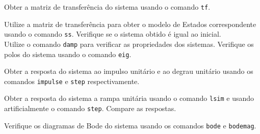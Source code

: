\documentclass{article}
\begin{document}
\newpage\begin{exercise}\label{ex3}
    Obter a matriz de transferência do sistema usando o comando \texttt{tf}.
\end{exercise}
\begin{resolution}

\end{resolution}

\newpage\begin{exercise}\label{ex4}
    Utilize a matriz de transferência para obter o modelo de Estados correspondente usando o comando \texttt{ss}. Verifique se o sistema obtido é igual ao inicial.\\

    Utilize o comando \texttt{damp} para verificar as propriedades dos sistemas. Verifique os polos do sistema usando o comando \texttt{eig}.
\end{exercise}
\begin{resolution}

\end{resolution}

\newpage\begin{exercise}\label{ex5}
    Obter a resposta do sistema ao impulso unitário e ao degrau unitário usando os comandos \texttt{impulse} e \texttt{step} respectivamente.
\end{exercise}
\begin{resolution}

\end{resolution}

\newpage\begin{exercise}\label{ex6}
    Obter a resposta do sistema a rampa unitária usando o comando \texttt{lsim} e usando artificialmente o comando \texttt{step}. Compare as respostas.
\end{exercise}
\begin{resolution}

\end{resolution}

\newpage\begin{exercise}\label{ex7}
    Verifique os diagramas de Bode do sistema usando os comandos \texttt{bode} e \texttt{bodemag}.
\end{exercise}
\begin{resolution}

\end{resolution}
\end{document}
